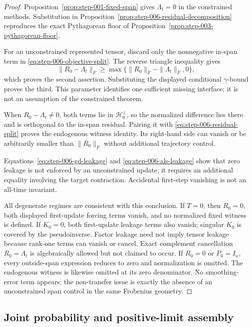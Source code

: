 \begin{proof}
Proposition~\ref{prop:step-001-fixed-span} gives $\Lambda_t=0$ in the
constrained methods.  Substitution in
Proposition~\ref{prop:step-006-residual-decomposition} reproduces the exact
Pythagorean floor of Proposition~\ref{prop:step-003-pythagorean-floor}.

For an unconstrained represented tensor, discard only the nonnegative
in-span term in \eqref{eq:step-006-objective-split}.  The reverse triangle
inequality gives
\[
 \|R_0-\Lambda_t\|_F
 \ge\max\{\|R_0\|_F-\|\Lambda_t\|_F,0\},
\]
which proves the second assertion.  Substituting the displayed conditional
$\gamma$-bound proves the third.  This parameter identifies one sufficient
missing interface; it is not an assumption of the constrained theorem.

When $R_0-\Lambda_t\ne0$, both terms lie in $\mathcal H_0^\perp$, so the
normalized difference lies there and is orthogonal to the in-span residual.
Pairing it with \eqref{eq:step-006-residual-split} proves the endogenous
witness identity.  Its right-hand side can vanish or be arbitrarily smaller
than $\|R_0\|_F$ without additional trajectory control.

Equations~\eqref{eq:step-006-gd-leakage} and
\eqref{eq:step-006-als-leakage} show that zero leakage is not enforced by an
unconstrained update; it requires an additional equality involving the target
contraction.  Accidental first-step vanishing is not an all-time invariant.

All degenerate regimes are consistent with this conclusion.  If $T=0$, then
$R_0=0$, both displayed first-update forcing terms vanish, and no normalized
fixed witness is defined.  If $K_0=0$, both first-update leakage terms also
vanish; singular $K_0$ is covered by the pseudoinverse.  Factor leakage need
not imply tensor leakage because rank-one terms can vanish or cancel.  Exact
complement cancellation $R_0=\Lambda_t$ is algebraically allowed but not
claimed to occur.  If $R_0=0$ or $P_0=I_n$, every outside-span expression
reduces to zero and normalization is omitted.  The endogenous witness is
likewise omitted at its zero denominator.  No smoothing-error term appears:
the non-transfer issue is exactly the absence of an unconstrained span
control in the same Frobenius geometry.
\end{proof}

\subsection{Joint probability and positive-limit assembly}\label{app:step-007}


